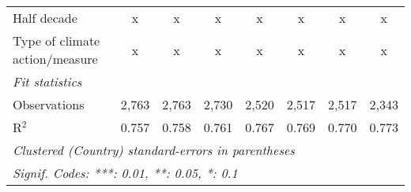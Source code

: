 \begin{tabular}{lccccccc}
   Half decade                                                                         & x             & x             & x             & x             & x            & x            & x\\  
   Type of climate action/measure                                                      & x             & x             & x             & x             & x            & x            & x\\  
   \midrule \emph{Fit statistics}\\
   Observations                                                                        & 2,763         & 2,763         & 2,730         & 2,520         & 2,517        & 2,517        & 2,343\\  
   R$^2$                                                                               & 0.757         & 0.758         & 0.761         & 0.767         & 0.769        & 0.770        & 0.773\\  
   \midrule
   \multicolumn{8}{l}{\emph{Clustered (Country) standard-errors in parentheses}}\\
   \multicolumn{8}{l}{\emph{Signif. Codes: ***: 0.01, **: 0.05, *: 0.1}}\\
\end{tabular}
\par\endgroup


